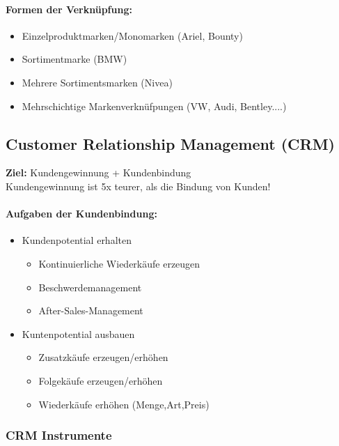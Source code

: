 \documentclass[../ZF_Wing.tex]{subfiles}
\begin{document}
\paragraph{Formen der Verknüpfung: \\}

\begin{itemize}
	\item Einzelproduktmarken/Monomarken (Ariel, Bounty)
	\item Sortimentmarke (BMW)
	\item Mehrere Sortimentsmarken (Nivea)
	\item Mehrschichtige Markenverknüfpungen (VW, Audi, Bentley....)
\end{itemize}



\subsection{Customer Relationship Management (CRM)}
\textbf{Ziel: } Kundengewinnung + Kundenbindung\\
Kundengewinnung ist 5x teurer, als die Bindung von Kunden!\\

\paragraph{Aufgaben der Kundenbindung: \\}
\begin{itemize}
	\item Kundenpotential erhalten
	\begin{itemize}
		\item Kontinuierliche Wiederkäufe erzeugen
		\item Beschwerdemanagement
		\item After-Sales-Management 
	\end{itemize}
	\item Kuntenpotential ausbauen
	\begin{itemize}
		\item Zusatzkäufe erzeugen/erhöhen
		\item Folgekäufe erzeugen/erhöhen
		\item Wiederkäufe erhöhen (Menge,Art,Preis)
	\end{itemize}
\end{itemize}


\subsubsection{CRM Instrumente}
\end{document}
